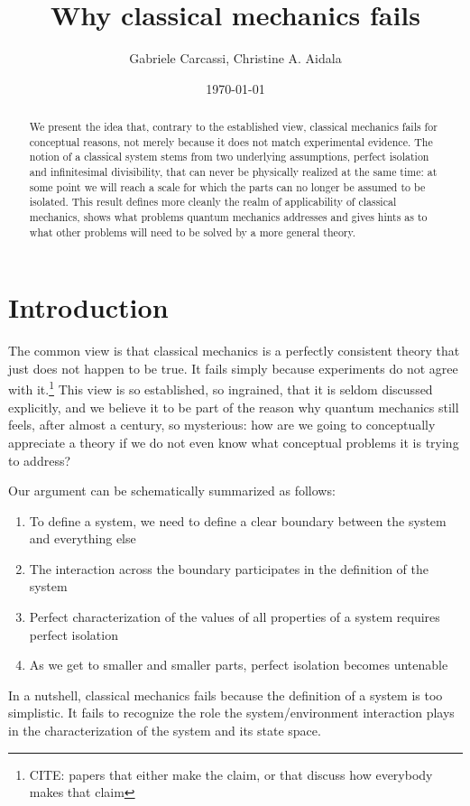 \documentclass[10pt,twocolumn, nofootinbib]{revtex4-2}
\begin{document}
\title{Why classical mechanics fails}
\author{Gabriele Carcassi, Christine A. Aidala}

\date{\today}


\begin{abstract}
We present the idea that, contrary to the established view, classical mechanics fails for conceptual reasons, not merely because it does not match experimental evidence. The notion of a classical system stems from two underlying assumptions, perfect isolation and infinitesimal divisibility, that can never be physically realized at the same time: at some point we will reach a scale for which the parts can no longer be assumed to be isolated. This result defines more cleanly the realm of applicability of classical mechanics, shows what problems quantum mechanics addresses and gives hints as to what other problems will need to be solved by a more general theory.
\end{abstract}

\maketitle

\section{Introduction}

The common view is that classical mechanics is a perfectly consistent theory that just does not happen to be true. It fails simply because experiments do not agree with it.\footnote{CITE: papers that either make the claim, or that discuss how everybody makes that claim} This view is so established, so ingrained, that it is seldom discussed explicitly, and we believe it to be part of the reason why quantum mechanics still feels, after almost a century, so mysterious: how are we going to conceptually appreciate a theory if we do not even know what conceptual problems it is trying to address?

Our argument can be schematically summarized as follows:
\begin{enumerate}
	\item To define a system, we need to define a clear boundary between the system and everything else
	\item The interaction across the boundary participates in the definition of the system
	\item Perfect characterization of the values of all properties of a system requires perfect isolation
	\item As we get to smaller and smaller parts, perfect isolation becomes untenable
\end{enumerate}
In a nutshell, classical mechanics fails because the definition of a system is too simplistic. It fails to recognize the role the system/environment interaction plays in the characterization of the system and its state space.
\end{document}
